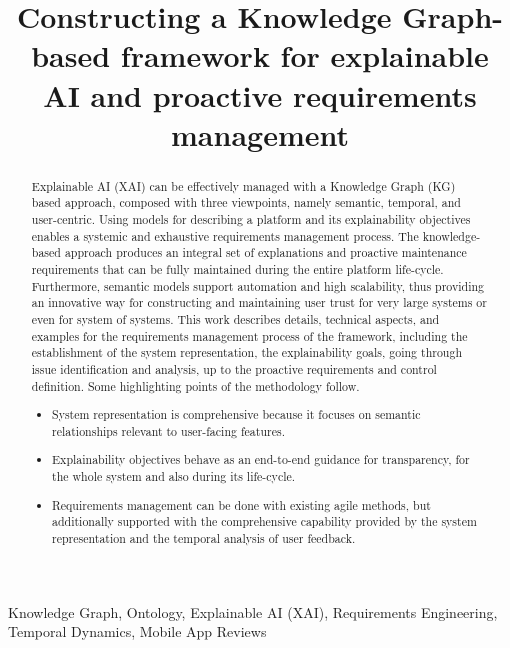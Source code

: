 \documentclass[conference]{IEEEtran}
\begin{document}
\title{Constructing a Knowledge Graph-based framework for explainable AI and proactive requirements management}

\author{\IEEEauthorblockN{}
\IEEEauthorblockA{}}

\maketitle

\begin{abstract}
Explainable AI (XAI) can be effectively managed with a Knowledge Graph (KG) based approach, composed with three viewpoints, namely semantic, temporal, and user-centric. Using models for describing a platform and its explainability objectives enables a systemic and exhaustive requirements management process. The knowledge-based approach produces an integral set of explanations and proactive maintenance requirements that can be fully maintained during the entire platform life-cycle. Furthermore, semantic models support automation and high scalability, thus providing an innovative way for constructing and maintaining user trust for very large systems or even for system of systems. This work describes details, technical aspects, and examples for the requirements management process of the framework, including the establishment of the system representation, the explainability goals, going through issue identification and analysis, up to the proactive requirements and control definition. Some highlighting points of the methodology follow.
\begin{itemize}
  \item System representation is comprehensive because it focuses on semantic relationships relevant to user-facing features.
  \item Explainability objectives behave as an end-to-end guidance for transparency, for the whole system and also during its life-cycle.
  \item Requirements management can be done with existing agile methods, but additionally supported with the comprehensive capability provided by the system representation and the temporal analysis of user feedback.
\end{itemize}
\end{abstract}

\begin{IEEEkeywords}
Knowledge Graph, Ontology, Explainable AI (XAI), Requirements Engineering, Temporal Dynamics, Mobile App Reviews
\end{IEEEkeywords}
\end{document}
